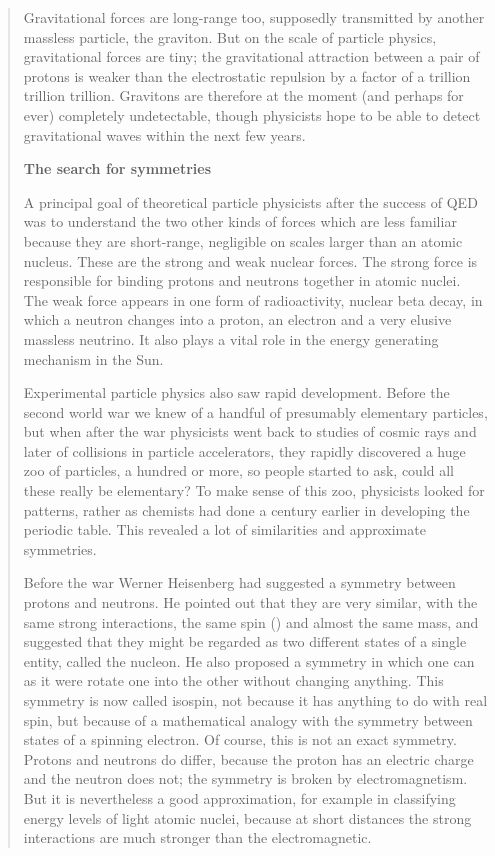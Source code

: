 \begin{quote}
Gravitational forces are long-range too, supposedly transmitted by another massless particle, the graviton. But on the scale of particle physics, gravitational forces are tiny; the gravitational attraction between a pair of protons is weaker than the electrostatic repulsion by a factor of a trillion trillion trillion. Gravitons are therefore at the moment (and perhaps for ever) completely undetectable, though physicists hope to be able to detect gravitational waves within the next few years.

\textbf{The search for symmetries}

A principal goal of theoretical particle physicists after the success of QED was to understand the two other kinds of forces which are less familiar because they are short-range, negligible on scales larger than an atomic nucleus. These are the strong and weak nuclear forces. The strong force is responsible for binding protons and neutrons together in atomic nuclei. The weak force appears in one form of radioactivity, nuclear beta decay, in which a neutron changes into a proton, an electron and a very elusive massless neutrino. It also plays a vital role in the energy generating mechanism in the Sun.

Experimental particle physics also saw rapid development. Before the second world war we knew of a handful of presumably elementary particles, but when after the war physicists went back to studies of cosmic rays and later of collisions in particle accelerators, they rapidly discovered a huge zoo of particles, a hundred or more, so people started to ask, could all these really be elementary? To make sense of this zoo, physicists looked for patterns, rather as chemists had done a century earlier in developing the periodic table. This revealed a lot of similarities and approximate symmetries.

Before the war Werner Heisenberg had suggested a symmetry between protons and neutrons. He pointed out that they are very similar, with the same strong interactions, the same spin () and almost the same mass, and suggested that they might be regarded as two different states of a single entity, called the nucleon. He also proposed a symmetry in which one can as it were rotate one into the other without changing anything. This symmetry is now called isospin, not because it has anything to do with real spin, but because of a mathematical analogy with the symmetry between states of a spinning electron. Of course, this is not an exact symmetry. Protons and neutrons do differ, because the proton has an electric charge and the neutron does not; the symmetry is broken by electromagnetism. But it is nevertheless a good approximation, for example in classifying energy levels of light atomic nuclei, because at short distances the strong interactions are much stronger than the electromagnetic.


\end{quote}
